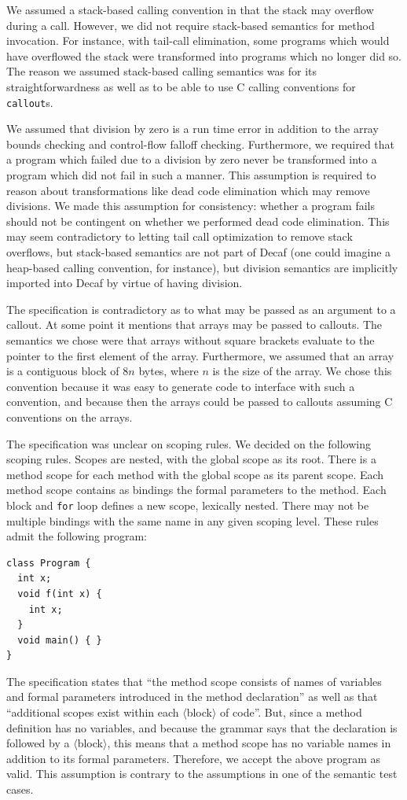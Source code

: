 \documentclass[11pt]{article}
\begin{document}
We assumed a stack-based calling convention in that the stack may
overflow during a call.  However, we did not require stack-based
semantics for method invocation.  For instance, with tail-call
elimination, some programs which would have overflowed the stack were
transformed into programs which no longer did so.  The reason we
assumed stack-based calling semantics was for its straightforwardness
as well as to be able to use C calling conventions for
\texttt{callout}s.

We assumed that division by zero is a run time error in addition to
the array bounds checking and control-flow falloff checking.
Furthermore, we required that a program which failed due to a division
by zero never be transformed into a program which did not fail in such
a manner.  This assumption is required to reason about transformations
like dead code elimination which may remove divisions.  We made this
assumption for consistency: whether a program fails should not be
contingent on whether we performed dead code elimination.  This may
seem contradictory to letting tail call optimization to remove stack
overflows, but stack-based semantics are not part of Decaf (one could
imagine a heap-based calling convention, for instance), but division
semantics are implicitly imported into Decaf by virtue of having
division.

The specification is contradictory as to what may be passed as an
argument to a callout.  At some point it mentions that arrays may be
passed to callouts.  The semantics we chose were that arrays without
square brackets evaluate to the pointer to the first element of the
array.  Furthermore, we assumed that an array is a contiguous block of
$8n$ bytes, where $n$ is the size of the array.  We chose this
convention because it was easy to generate code to interface with such
a convention, and because then the arrays could be passed to callouts
assuming C conventions on the arrays.

The specification was unclear on scoping rules.  We decided on the
following scoping rules.  Scopes are nested, with the global scope as
its root.  There is a method scope for each method with the global
scope as its parent scope.  Each method scope contains as bindings the
formal parameters to the method.  Each block and \texttt{for} loop
defines a new scope, lexically nested.  There may not be multiple
bindings with the same name in any given scoping level.  These rules
admit the following program:
\begin{verbatim}
class Program {
  int x;
  void f(int x) {
    int x;
  }
  void main() { }
}
\end{verbatim}
The specification states that ``the method scope consists of names of
variables and formal parameters introduced in the method declaration''
as well as that ``additional scopes exist within each
$\langle$block$\rangle$ of code''.  But, since a method definition has
no variables, and because the grammar says that the declaration is
followed by a $\langle$block$\rangle$, this means that a method scope
has no variable names in addition to its formal parameters.
Therefore, we accept the above program as valid.  This assumption is
contrary to the assumptions in one of the semantic test cases.
\end{document}
